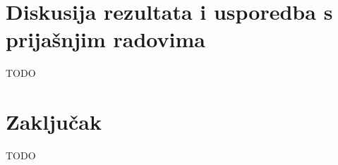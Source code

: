 \documentclass[conference, utf8]{IEEEtran}
\begin{document}
\pagebreak

\section{Diskusija rezultata i usporedba s prijašnjim radovima}
TODO

\pagebreak

\section{Zaključak}
TODO



\end{document}
